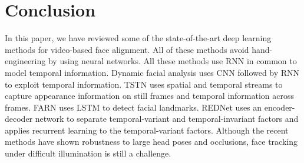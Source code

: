\documentclass{llncs}
\begin{document}
	\section{Conclusion}
	
	In this paper, we have reviewed some of the state-of-the-art deep learning methods for video-based face alignment. All of these methods avoid hand-engineering by using neural networks. All these methods use RNN in common to model temporal information. Dynamic facial analysis\cite{dynamic_facial_analysis} uses CNN followed by RNN to exploit temporal information. TSTN\cite{tstn} uses spatial and temporal streams to capture appearance information on still frames and temporal information across frames. FARN\cite{farn} uses LSTM to detect facial landmarks. REDNet\cite{rednet} uses an encoder-decoder network to separate temporal-variant and temporal-invariant factors and applies recurrent learning to the temporal-variant factors. Although the recent methods have shown robustness to large head poses and occlusions, face tracking under difficult illumination is still a challenge.
	
	
	
	
\end{document}
